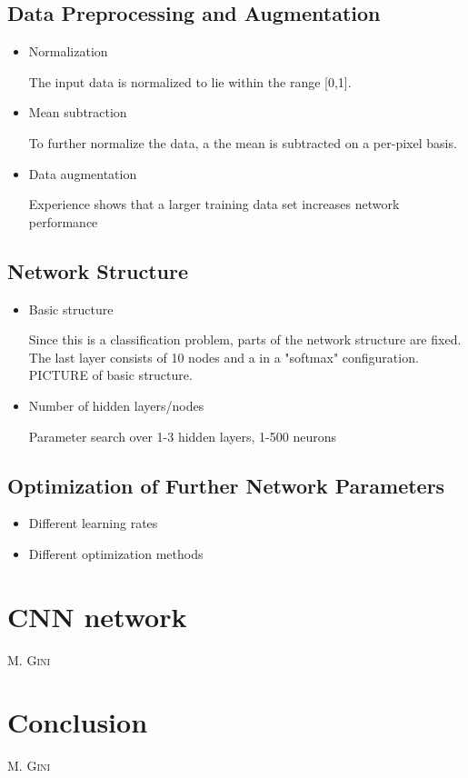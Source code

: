 \documentclass[12pt, a4paper]{article}
\makeatletter
\newcommand{\sectionauthor}[1]{%
  {\parindent0pt\vspace*{-5pt}%
  \linespread{1.1}\large\scshape#1%
  \par\nobreak\vspace*{15pt}}
  \@afterheading%
}
\numberwithin{equation}{section}
\makeatother
\begin{document}
\subsection{Data Preprocessing and Augmentation}

\begin{itemize}
	\item Normalization
	
	The input data is normalized to lie within the range [0,1].
	
	\item Mean subtraction
	
	To further normalize the data, a the mean is subtracted on a per-pixel basis.
	
	\item Data augmentation
	
	Experience shows that a larger training data set increases network performance
\end{itemize}

\subsection{Network Structure}
	
\begin{itemize}
	\item Basic structure
	
	Since this is a classification problem, parts of the network structure are fixed. The last layer consists of 10 nodes and a in a "softmax" configuration. PICTURE of basic structure.
	
	\item Number of hidden layers/nodes
	
	Parameter search over 1-3 hidden layers, 1-500 neurons
	 	
	 	
\end{itemize}

	
\subsection{Optimization of Further Network Parameters}

\begin{itemize}
	\item Different learning rates
	
	\item Different optimization methods
\end{itemize}
	    
\section{CNN network}
	\pagestyle{mario}
	\sectionauthor{M. Gini}
		
\section{Conclusion}
     \pagestyle{mario}
     \sectionauthor{M. Gini}


    \newpage
    
    
\end{document}
